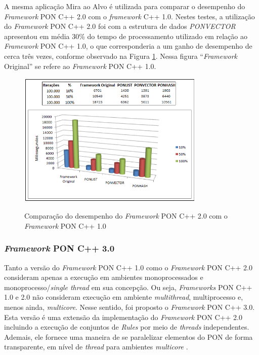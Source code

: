 \FloatBarrier

A mesma aplicação Mira ao Alvo é utilizada para comparar o desempenho do
\textit{Framework} PON C++ 2.0 com o \textit{framework} C++ 1.0. Nestes testes, a
utilização do \textit{Framework} PON C++ 2.0 foi com a estrutura de dados
\textit{PONVECTOR} apresentou em média 30\% do tempo de processamento utilizado
em relação ao \textit{Framework} PON C++ 1.0, o que corresponderia a um ganho de
desempenho de cerca três vezes, conforme observado na Figura
\ref{fig:fw2_vs_fw1}. Nessa figura \enquote{\textit{Framework} Original} se refere  ao
\textit{Framework} PON C++ 1.0.

\begin{figure}[!htb]
  \centering
  \caption{Comparação do desempenho do \textit{Framework} PON C++ 2.0 com o
  \textit{Framework} PON C++ 1.0}
  \includegraphics[width=0.8\textwidth]{../figures/fw2_vs_fw1.png}
  \label{fig:fw2_vs_fw1}
\end{figure}

\subsubsection{\textit{Framework} PON C++ 3.0}\label{sec:fw3}

Tanto a versão do \textit{Framework} PON C++ 1.0 como o \textit{Framework} PON
C++ 2.0 consideram apenas a execução em ambientes monoprocessados e
monoprocesso/\textit{single thread} em sua concepção. Ou seja, \textit{Frameworks}
PON C++ 1.0 e 2.0 não consideram execução em ambiente \textit{multithread},
multiprocesso e, menos ainda, \textit{multicore}. Nesse sentido, foi proposto o
\textit{Framework} PON C++ 3.0. Esta versão é uma extensão da implementação do
\textit{Framework} PON C++ 2.0 incluindo a execução de conjuntos de
\textit{Rules} por meio de \textit{threads} independentes. Ademais, ele fornece
uma maneira de se paralelizar elementos do PON de forma transparente, em nível
de \textit{thread} para ambientes \textit{multicore} \cite{belmonte_2012}.


